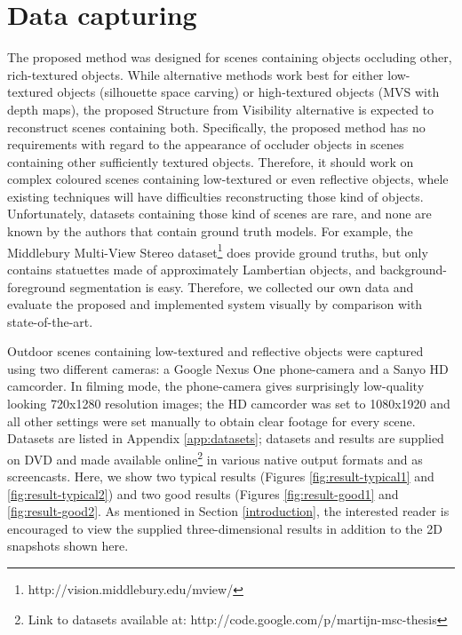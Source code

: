 

\section{Data capturing}
The proposed method was designed for scenes containing objects occluding other, rich-textured objects. While alternative methods work best for either low-textured objects (silhouette space carving) or high-textured objects (MVS with depth maps), the proposed Structure from Visibility alternative is expected to reconstruct scenes containing both. Specifically, the proposed method has no requirements with regard to the appearance of occluder objects in scenes containing other sufficiently textured objects. Therefore, it should work on complex coloured scenes containing low-textured or even reflective objects, whele existing techniques will have difficulties reconstructing those kind of objects. Unfortunately, datasets containing those kind of scenes are rare, and none are known by the authors that contain ground truth models. For example, the Middlebury Multi-View Stereo dataset\footnote{http://vision.middlebury.edu/mview/} \cite{Seitz2006} does provide ground truths, but only contains statuettes made of approximately Lambertian objects, and background-foreground segmentation is easy. Therefore, we collected our own data and evaluate the proposed and implemented system visually by comparison with state-of-the-art.

Outdoor scenes containing low-textured and reflective objects were captured using two different cameras: a Google Nexus One phone-camera and a Sanyo HD camcorder. In filming mode, the phone-camera gives surprisingly low-quality looking 720x1280 resolution images; the HD camcorder was set to 1080x1920 and all other settings were set manually to obtain clear footage for every scene. Datasets are listed in Appendix \ref{app:datasets}; datasets and results are supplied on DVD and made available online\footnote{Link to datasets available at: http://code.google.com/p/martijn-msc-thesis} in various native output formats and as screencasts. Here, we show two typical results (Figures \ref{fig:result-typical1} and \ref{fig:result-typical2}) and two good results (Figures \ref{fig:result-good1}  and \ref{fig:result-good2}. As mentioned in Section \ref{introduction}, the interested reader is encouraged to view the supplied three-dimensional results in addition to the 2D snapshots shown here.

